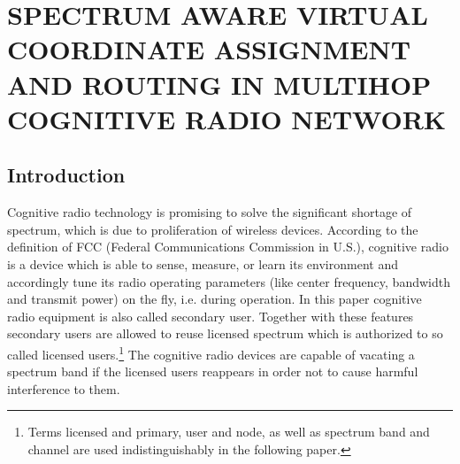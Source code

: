 \chapter{SPECTRUM AWARE VIRTUAL COORDINATE ASSIGNMENT AND ROUTING IN MULTIHOP COGNITIVE RADIO NETWORK}
%
%



\section{Introduction}
\label{introduction}
Cognitive radio technology is promising to solve the significant shortage of spectrum, which is due to proliferation of wireless devices.
According to the definition of FCC (Federal Communications Commission in U.S.), cognitive radio is a device which is able to sense, measure, or learn its environment and accordingly tune its radio operating parameters (like center frequency, bandwidth and transmit power) on the fly, i.e. during operation. 
In this paper cognitive radio equipment is also called secondary user.
Together with these features secondary users are allowed to reuse licensed spectrum which is authorized to so called licensed users.\footnote{Terms licensed and primary, user and node, as well as spectrum band and channel are used indistinguishably in the following paper.}
The cognitive radio devices are capable of vacating a spectrum band if the licensed users reappears in order not to cause harmful interference to them.


